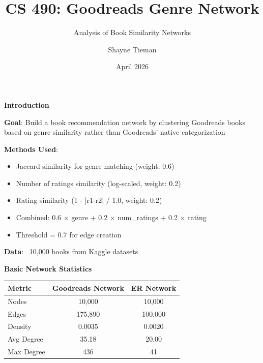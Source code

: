 \documentclass{beamer}
\title{CS 490: Goodreads Genre Network}
\subtitle{Analysis of Book Similarity Networks}
\author{Shayne Tieman}
\date{April 2026}
\begin{document}
  \begin{frame}
    \titlepage
  \end{frame}

  \begin{frame}
    \fontsize{10}{12}\selectfont
    \fontsize{12}{14}\selectfont
    \textbf{Introduction}
    
    \vspace{0.5cm}
    \textbf{Goal}: Build a book recommendation network by clustering Goodreads books based on genre similarity rather than Goodreads' native categorization
    
    \vspace{0.5cm}
    \textbf{Methods Used}:
    \begin{itemize}
      \item Jaccard similarity for genre matching (weight: 0.6)
      \item Number of ratings similarity (log-scaled, weight: 0.2)
      \item Rating similarity (1 - |r1-r2| / 1.0, weight: 0.2)
      \item Combined: 0.6 $\times$ genre + 0.2 $\times$ num\_ratings + 0.2 $\times$ rating
      \item Threshold = 0.7 for edge creation
    \end{itemize}
    
    \vspace{0.5cm}
    \textbf{Data}: ~10,000 books from Kaggle datasets
  \end{frame}

  \begin{frame}
    \fontsize{10}{12}\selectfont
    \textbf{Basic Network Statistics}
    
    \vspace{0.3cm}
    \begin{table}
      \centering
      \fontsize{10}{12}\selectfont
      \begin{tabular}{lcc}
        \toprule
        Metric & Goodreads Network & ER Network \\
        \midrule
        Nodes & 10,000 & 10,000 \\
        Edges & 175,890 & 100,000 \\
        Density & 0.0035 & 0.0020 \\
        Avg Degree & 35.18 & 20.00 \\
        Max Degree & 436 & 41 \\
        \bottomrule
      \end{tabular}
    \end{table}
  \end{frame}
\end{document}
